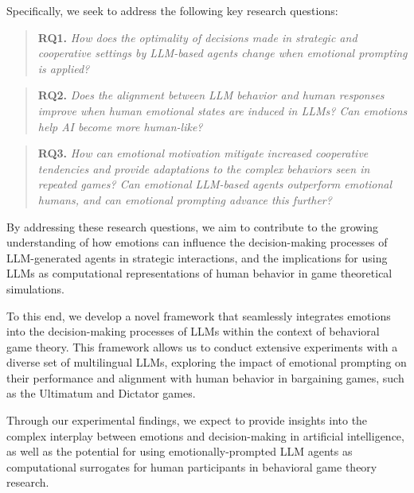 \documentclass{article}
\begin{document}
Specifically, we seek to address the following key research questions:

\begin{quote}
\textbf{RQ1.} \textit{How does the optimality of decisions made in strategic and cooperative settings by LLM-based agents change when emotional prompting is applied?}
\end{quote}

\begin{quote}
\textbf{RQ2.} \textit{Does the alignment between LLM behavior and human responses improve when human emotional states are induced in LLMs? Can emotions help AI become more human-like?}
\end{quote}

\begin{quote}
\textbf{RQ3.} \textit{How can emotional motivation mitigate increased cooperative tendencies and provide adaptations to the complex behaviors seen in repeated games? Can emotional LLM-based agents outperform emotional humans, and can emotional prompting advance this further?}
\end{quote}

By addressing these research questions, we aim to contribute to the growing understanding of how emotions can influence the decision-making processes of LLM-generated agents in strategic interactions, and the implications for using LLMs as computational representations of human behavior in game theoretical simulations.

To this end, we develop a novel framework that seamlessly integrates emotions into the decision-making processes of LLMs within the context of behavioral game theory. This framework allows us to conduct extensive experiments with a diverse set of multilingual LLMs, exploring the impact of emotional prompting on their performance and alignment with human behavior in bargaining games, such as the Ultimatum and Dictator games.

Through our experimental findings, we expect to provide insights into the complex interplay between emotions and decision-making in artificial intelligence, as well as the potential for using emotionally-prompted LLM agents as computational surrogates for human participants in behavioral game theory research.




\end{document}
